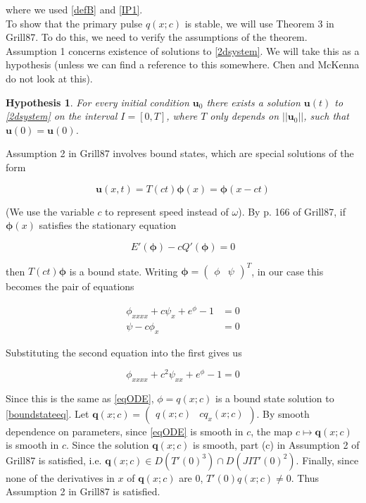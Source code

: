\documentclass[12pt]{article}
\newtheorem{hypothesis}{Hypothesis}
\begin{document}
where we used \eqref{defB} and \eqref{IP1}.\\

To show that the primary pulse $q(x; c)$ is stable, we will use Theorem 3 in Grill87. To do this, we need to verify the assumptions of the theorem. Assumption 1 concerns existence of solutions to \eqref{2dsystem}. We will take this as a hypothesis (unless we can find a reference to this somewhere. Chen and McKenna do not look at this).

\begin{hypothesis}
For every initial condition $\textbf{u}_0$ there exists a solution $\textbf{u}(t)$ to \eqref{2dsystem} on the interval $I = [0, T]$, where $T$ only depends on $||\textbf{u}_0||$, such that $\textbf{u}(0) = \textbf{u}(0)$. 
\end{hypothesis}

Assumption 2 in Grill87 involves bound states, which are special solutions of the form

\begin{equation}\label{boundstate}
\textbf{u}(x, t) = T(ct)\boldsymbol\phi(x) = \boldsymbol\phi(x - ct)
\end{equation}

(We use the variable $c$ to represent speed instead of $\omega$). By p. 166 of Grill87, if $\boldsymbol\phi(x) $ satisfies the stationary equation

\begin{equation}\label{boundstateeq}
E'(\boldsymbol\phi) - c Q'(\boldsymbol\phi) = 0
\end{equation}

then $T(ct)\boldsymbol\phi$ is a bound state. Writing $\boldsymbol\phi = \begin{pmatrix}\phi&\psi\end{pmatrix}^T$, in our case this becomes the pair of equations

\begin{align*}
\phi_{xxxx} + c \psi_x + e^{\phi} - 1 &= 0 \\
\psi - c \phi_x &= 0
\end{align*} 

Substituting the second equation into the first gives us

\begin{equation}
\phi_{xxxx} + c^2 \psi_{xx} + e^{\phi} - 1 = 0
\end{equation}

Since this is the same as \eqref{eqODE}, $\phi = q(x; c)$ is a bound state solution to \eqref{boundstateeq}. Let $\textbf{q}(x; c) =\begin{pmatrix}q(x; c) &c q_x(x; c) \end{pmatrix}$. By smooth dependence on parameters, since \eqref{eqODE} is smooth in $c$, the map $c \mapsto \textbf{q}(x; c)$ is smooth in $c$. Since the solution $\textbf{q}(x; c)$ is smooth, part (c) in Assumption 2 of Grill87 is satisfied, i.e. $\textbf{q}(x; c) \in D(T'(0)^3) \cap D(J I T'(0)^2)$. Finally, since none of the derivatives in $x$ of $\textbf{q}(x; c)$ are 0, $T'(0)q(x; c) \neq 0$. Thus Assumption 2 in Grill87 is satisfied.\\
\end{document}
